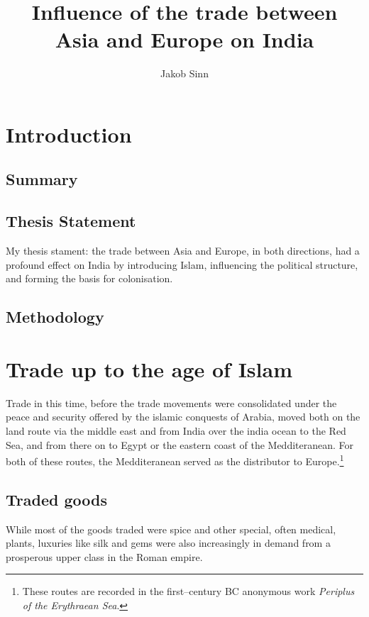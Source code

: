 \documentclass[11pt, a4paper, headings=standardclasses]{scrartcl}
\begin{document}
\renewcommand{\baselinestretch}{1.5}
\subject{Facharbeit}
\author{Jakob Sinn}
\title{Influence of the trade between \\ Asia and Europe on India}
\maketitle
\thispagestyle{empty}
\clearpage
\tableofcontents
{}
\clearpage
\section{Introduction}
\subsection{Summary}

\subsection{Thesis Statement}
My thesis stament: the trade between Asia and Europe, in both directions, had a profound effect on India by introducing Islam, influencing the political structure, and forming the basis for colonisation.
\subsection{Methodology}
 
\section{Trade up to the age of Islam}
Trade in this time, before the trade movements were consolidated under the peace and security offered by the islamic conquests of Arabia, moved both on the land route via the middle east and from India over the india ocean to the Red Sea, and from there on to Egypt or the eastern coast of the Medditeranean.\autocite[Chapter 7]{Rome} For both of these routes, the Medditeranean served as the distributor to Europe.\footnote{These routes are recorded in the first--century BC anonymous work \emph{Periplus of the Erythraean Sea}.}

\subsection{Traded goods}
While most of the goods traded were spice and other special, often medical, plants, luxuries like silk and gems were also increasingly in demand from a prosperous upper class in the Roman empire.\autocite{RIS}
\end{document}
